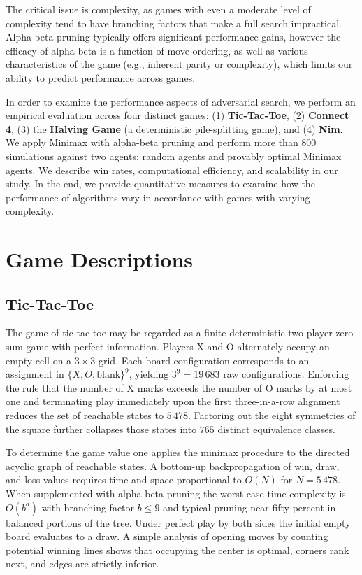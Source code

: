 \documentclass[12pt]{article}
\begin{document}
The critical issue is complexity, as games with even a moderate level of complexity tend to have branching factors that make a full search impractical. Alpha-beta pruning typically offers significant performance gains, however the efficacy of alpha-beta is a function of move ordering, as well as various characteristics of the game (e.g., inherent parity or complexity), which limits our ability to predict performance across games.

In order to examine the performance aspects of adversarial search, we perform an empirical evaluation across four distinct games: (1) \textbf{Tic-Tac-Toe}, (2) \textbf{Connect 4}, (3) the \textbf{Halving Game} (a deterministic pile-splitting game), and (4) \textbf{Nim}. We apply Minimax with alpha-beta pruning and perform more than 800 simulations against two agents: random agents and provably optimal Minimax agents. We describe win rates, computational efficiency, and scalability in our study. In the end, we provide quantitative measures to examine how the performance of algorithms vary in accordance with games with varying complexity.


\section{Game Descriptions}

\subsection{Tic-Tac-Toe}

The game of tic tac toe may be regarded as a finite deterministic two-player zero-sum game with perfect information. Players X and O alternately occupy an empty cell on a $3\times3$ grid. Each board configuration corresponds to an assignment in $\{X,O,\mathrm{blank}\}^9$, yielding $3^9 = 19\,683$ raw configurations. Enforcing the rule that the number of X marks exceeds the number of O marks by at most one and terminating play immediately upon the first three-in-a-row alignment reduces the set of reachable states to $5\,478$. Factoring out the eight symmetries of the square further collapses those states into $765$ distinct equivalence classes.

To determine the game value one applies the minimax procedure to the directed acyclic graph of reachable states. A bottom-up backpropagation of win, draw, and loss values requires time and space proportional to $O(N)$ for $N=5\,478$. When supplemented with alpha-beta pruning the worst-case time complexity is $O(b^d)$ with branching factor $b\le9$ and typical pruning near fifty percent in balanced portions of the tree. Under perfect play by both sides the initial empty board evaluates to a draw. A simple analysis of opening moves by counting potential winning lines shows that occupying the center is optimal, corners rank next, and edges are strictly inferior.
\end{document}
